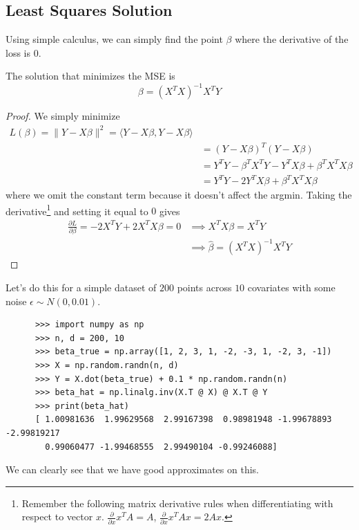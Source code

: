 \subsection{Least Squares Solution} 

  Using simple calculus, we can simply find the point $\beta$ where the derivative of the loss is $0$. 
 
  \begin{theorem}
    \label{thm:least-squares-solution-for-linear-regression}
    The solution that minimizes the MSE is 
    \begin{equation}
      \beta = (X^T X)^{-1} X^T Y 
    \end{equation}
  \end{theorem}
  \begin{proof}
    We simply minimize 
    \begin{align}
      L(\beta) = \|Y - X \beta\|^2 = \langle Y - X \beta, Y - X \beta \rangle \\ 
      & = (Y - X \beta)^T (Y - X \beta) \\ 
      & = Y^T Y - \beta^T X^T Y - Y^T X \beta + \beta^T X^T X \beta \\
      & = Y^T Y - 2 Y^T X \beta + \beta^T X^T X \beta 
    \end{align}
    where we omit the constant term because it doesn't affect the argmin. Taking the derivative\footnote{Remember the following matrix derivative rules when differentiating with respect to vector $x$. $\frac{\partial}{\partial x} x^T A = A$, $\frac{\partial}{\partial x} x^T A x = 2 Ax$. } and setting it equal to $0$ gives 
    \begin{align}
    \frac{\partial L}{\partial \beta} = - 2 X^T Y + 2 X^T X \beta = 0  
    & \implies X^T X \beta = X^T Y \\ 
    & \implies \hat{\beta} = (X^T X)^{-1} X^T Y
    \end{align}
  \end{proof} 

  \begin{example}[Simulation]
    \label{ex:simulation}
    Let's do this for a simple dataset of $200$ points across $10$ covariates with some noise $\epsilon \sim N(0, 0.01)$. 
    \begin{lstlisting}
      >>> import numpy as np 
      >>> n, d = 200, 10
      >>> beta_true = np.array([1, 2, 3, 1, -2, -3, 1, -2, 3, -1])
      >>> X = np.random.randn(n, d)
      >>> Y = X.dot(beta_true) + 0.1 * np.random.randn(n)
      >>> beta_hat = np.linalg.inv(X.T @ X) @ X.T @ Y 
      >>> print(beta_hat)
      [ 1.00981636  1.99629568  2.99167398  0.98981948 -1.99678893 -2.99819217
        0.99060477 -1.99468555  2.99490104 -0.99246088]
    \end{lstlisting} 
    We can clearly see that we have good approximates on this. 
  \end{example}

